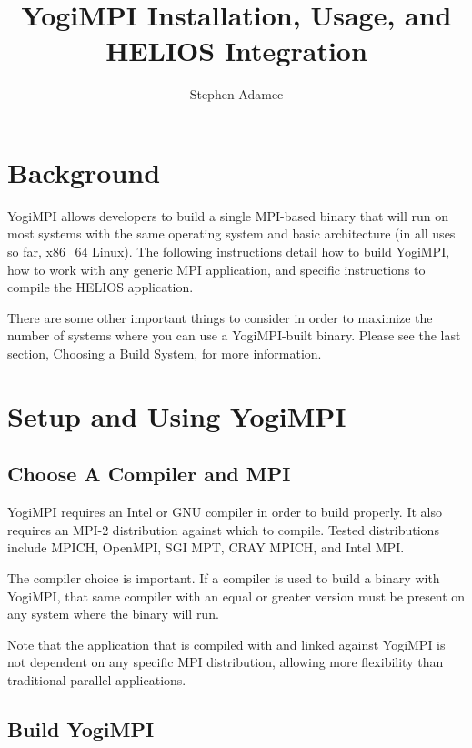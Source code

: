 \documentclass{article}
\begin{document}
\title{YogiMPI Installation, Usage, and HELIOS Integration}
\author{Stephen Adamec}

\maketitle

\section{Background}

YogiMPI allows developers to build a single MPI-based binary that will run on most systems with the same operating system and basic architecture (in all uses so far, x86\_64 Linux).  The following instructions detail how to build YogiMPI, how to work with any generic MPI application, and specific instructions to compile the HELIOS application.

There are some other important things to consider in order to maximize the number of systems where you can use a YogiMPI-built binary.  Please see the last section, Choosing a Build System, for more information.

\section{Setup and Using YogiMPI}

\subsection{Choose A Compiler and MPI}
YogiMPI requires an Intel or GNU compiler in order to build properly.  It also requires an MPI-2 distribution against which to compile.  Tested distributions include MPICH, OpenMPI, SGI MPT, CRAY MPICH, and Intel MPI.

The compiler choice is important.  If a compiler is used to build a binary with YogiMPI, that same compiler with an equal or greater version must be present on any system where the binary will run.

Note that the application that is compiled with and linked against YogiMPI is not dependent on any specific MPI distribution, allowing more flexibility than traditional parallel applications.

\subsection{Build YogiMPI}
\end{document}
